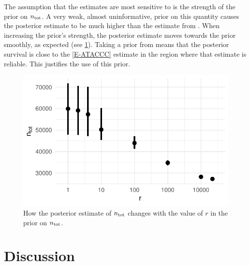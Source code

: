 \documentclass[thesis.tex]{subfiles}
\begin{document}
The assumption that the estimates are most sensitive to is the strength of the prior on $n_\text{tot}$.
A very weak, almost uninformative, prior on this quantity causes the posterior estimate to be much higher than the estimate from \textcite{birrellRTM2}.
When increasing the prior's strength, the posterior estimate moves towards the prior smoothly, as expected (see \cref{imperf-test:fig:ntot}).
Taking a prior from \textcite{birrellRTM2} means that the posterior survival is close to the \cref{E-ATACCC} estimate in the region where that estimate is reliable.
This justifies the use of this prior.
\begin{figure}
  \centering \includegraphics{cis-imperfect-testing/CIS_ntot}
  \caption{How the posterior estimate of $n_\text{tot}$ changes with the value of $r$ in the prior on $n_\text{tot}$.}
  \label{imperf-test:fig:ntot}
\end{figure}

\section{Discussion} \label{imperf-test:sec:discussion}

\end{document}
